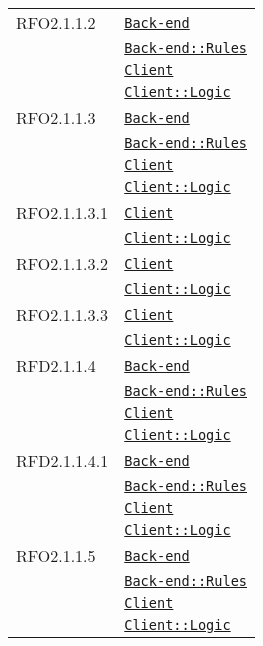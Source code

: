 \begin{longtable}{|>{\centering}m{3cm}|m{10cm}<{\centering}|}
RFO2.1.1.2 & \hyperref[Back-end]{\texttt{Back-end}}\\
& \hyperref[Back-end::Rules]{\texttt{Back-end::Rules}}\\
& \hyperref[Client]{\texttt{Client}}\\
& \hyperref[Client::Logic]{\texttt{Client::Logic}}\\ \hline

RFO2.1.1.3 & \hyperref[Back-end]{\texttt{Back-end}}\\
& \hyperref[Back-end::Rules]{\texttt{Back-end::Rules}}\\
& \hyperref[Client]{\texttt{Client}}\\
& \hyperref[Client::Logic]{\texttt{Client::Logic}}\\ \hline

RFO2.1.1.3.1 & \hyperref[Client]{\texttt{Client}}\\
& \hyperref[Client::Logic]{\texttt{Client::Logic}}\\ \hline

RFO2.1.1.3.2 & \hyperref[Client]{\texttt{Client}}\\
& \hyperref[Client::Logic]{\texttt{Client::Logic}}\\ \hline

RFO2.1.1.3.3 & \hyperref[Client]{\texttt{Client}}\\
& \hyperref[Client::Logic]{\texttt{Client::Logic}}\\ \hline

RFD2.1.1.4 & \hyperref[Back-end]{\texttt{Back-end}}\\
& \hyperref[Back-end::Rules]{\texttt{Back-end::Rules}}\\
& \hyperref[Client]{\texttt{Client}}\\
& \hyperref[Client::Logic]{\texttt{Client::Logic}}\\ \hline

RFD2.1.1.4.1 & \hyperref[Back-end]{\texttt{Back-end}}\\
& \hyperref[Back-end::Rules]{\texttt{Back-end::Rules}}\\
& \hyperref[Client]{\texttt{Client}}\\
& \hyperref[Client::Logic]{\texttt{Client::Logic}}\\ \hline

RFO2.1.1.5 & \hyperref[Back-end]{\texttt{Back-end}}\\
& \hyperref[Back-end::Rules]{\texttt{Back-end::Rules}}\\
& \hyperref[Client]{\texttt{Client}}\\
& \hyperref[Client::Logic]{\texttt{Client::Logic}}\\ \hline


\end{longtable}
